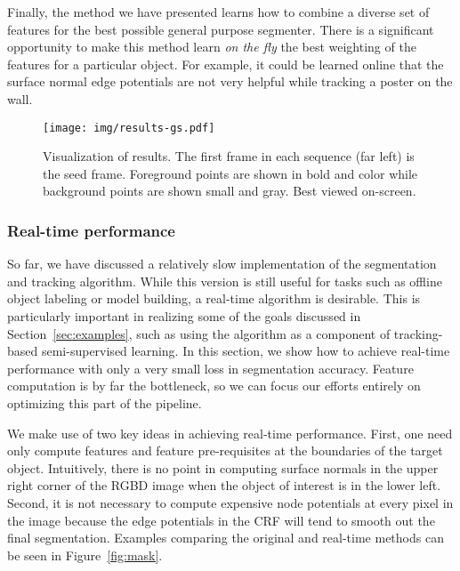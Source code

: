 \documentclass[graybox]{svmult}
\begin{document}
Finally, the method we have presented learns how to combine a diverse set of features for the best possible general purpose segmenter.  There is a significant opportunity to make this method learn \emph{on the fly} the best weighting of the features for a particular object.  For example, it could be learned online that the surface normal edge potentials are not very helpful while tracking a poster on the wall.


\begin{figure*}
  \centering
  \vspace{1cm}
  \texttt{[image: img/results-gs.pdf]}
  \caption{Visualization of results.  The first frame in each sequence (far left) is the seed frame.  Foreground points are shown in bold and color while background points are shown small and gray. Best viewed on-screen.}
  \label{fig:results}
  \vspace{50pt}
\end{figure*}


\subsubsection{Real-time performance}
\label{sec:realtime}

So far, we have discussed a relatively slow implementation of the segmentation and tracking algorithm.   While this version is still useful for tasks such as offline object labeling or model building, a real-time algorithm is desirable.  This is particularly important in realizing some of the goals discussed in Section~\ref{sec:examples}, such as using the algorithm as a component of tracking-based semi-supervised learning.  In this section, we show how to achieve real-time performance with only a very small loss in segmentation accuracy.  Feature computation is by far the bottleneck, so we can focus our efforts entirely on optimizing this part of the pipeline.

We make use of two key ideas in achieving real-time performance.  First, one need only compute features and feature pre-requisites at the boundaries of the target object.  Intuitively, there is no point in computing surface normals in the upper right corner of the RGBD image when the object of interest is in the lower left.  Second, it is not necessary to compute expensive node potentials at every pixel in the image because the edge potentials in the CRF will tend to smooth out the final segmentation.  Examples comparing the original and real-time methods can be seen in Figure~\ref{fig:mask}.
\end{document}
